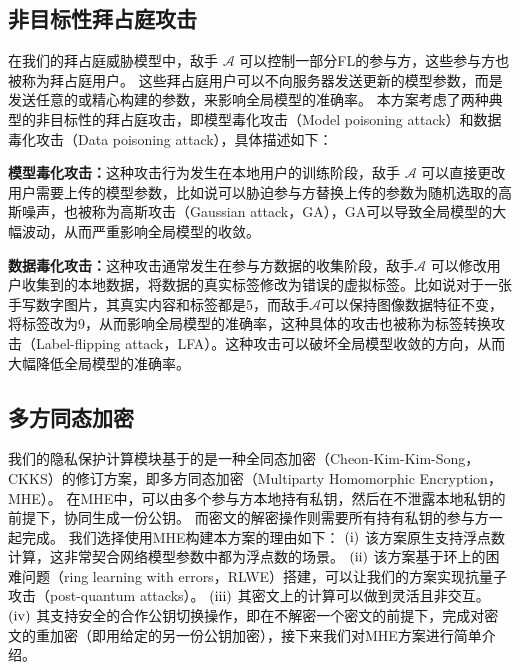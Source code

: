 \subsection{非目标性拜占庭攻击}
在我们的拜占庭威胁模型中，敌手 $\mathcal{A}$ 可以控制一部分FL的参与方，这些参与方也被称为拜占庭用户。
这些拜占庭用户可以不向服务器发送更新的模型参数，而是发送任意的或精心构建的参数，来影响全局模型的准确率。
本方案考虑了两种典型的非目标性的拜占庭攻击，即模型毒化攻击（Model poisoning attack）和数据毒化攻击（Data poisoning attack），具体描述如下：
\begin{compactitem}
	\item \textbf{模型毒化攻击：}这种攻击行为发生在本地用户的训练阶段，敌手 $\mathcal{A}$ 可以直接更改用户需要上传的模型参数，比如说可以胁迫参与方替换上传的参数为随机选取的高斯噪声，也被称为高斯攻击（Gaussian attack，GA）\cite{blanchard2017machine, dong2021flod}，GA可以导致全局模型的大幅波动，从而严重影响全局模型的收敛。
	\item  \textbf{数据毒化攻击：}这种攻击通常发生在参与方数据的收集阶段，敌手$\mathcal{A}$ 可以修改用户收集到的本地数据，将数据的真实标签修改为错误的虚拟标签。比如说对于一张手写数字图片，其真实内容和标签都是5，而敌手$\mathcal{A}$可以保持图像数据特征不变，将标签改为9，从而影响全局模型的准确率，这种具体的攻击也被称为标签转换攻击（Label-flipping attack，LFA）\cite{kairouz2019advances, dong2021flod, liu2021privacy}。这种攻击可以破坏全局模型收敛的方向，从而大幅降低全局模型的准确率。
\end{compactitem}

\subsection{多方同态加密}
我们的隐私保护计算模块基于的是一种全同态加密（Cheon-Kim-Kim-Song，CKKS\cite{cheon2017homomorphic}）的修订方案，即多方同态加密（Multiparty Homomorphic Encryption，MHE）。
在MHE中，可以由多个参与方本地持有私钥，然后在不泄露本地私钥的前提下，协同生成一份公钥。
而密文的解密操作则需要所有持有私钥的参与方一起完成。
我们选择使用MHE构建本方案的理由如下：
$(\rm \romannumeral1)$ 该方案原生支持浮点数计算，这非常契合网络模型参数中都为浮点数的场景。
$(\rm \romannumeral2)$ 该方案基于环上的困难问题（ring learning with errors，RLWE）搭建，可以让我们的方案实现抗量子攻击（post-quantum attacks）。
$(\rm \romannumeral3)$ 其密文上的计算可以做到灵活且非交互。
$(\rm \romannumeral4)$ 其支持安全的合作公钥切换操作，即在不解密一个密文的前提下，完成对密文的重加密（即用给定的另一份公钥加密），接下来我们对MHE方案进行简单介绍。

